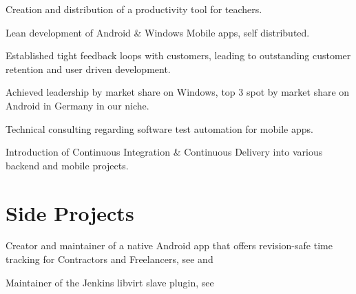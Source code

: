 \documentclass[]{resume}
\begin{document}
\begin{minipage}[t]{0.64\textwidth}
\begin{tightemize}
\item Creation and distribution of a productivity tool for teachers.
\item Lean development of Android \& Windows Mobile apps, self distributed.
\item Established tight feedback loops with customers, leading to outstanding customer retention and user driven development.
\item Achieved leadership by market share on Windows, top 3 spot by market share on Android in Germany in our niche.
\end{tightemize}
\sectionsep

\begin{tightemize}
\item Technical consulting regarding software test automation for mobile apps.
\item Introduction of Continuous Integration \& Continuous Delivery into various backend and mobile projects.
\end{tightemize}
\sectionsep



\section{Side Projects}

Creator and maintainer of a native Android app that offers revision-safe time tracking for Contractors and Freelancers, see \href{https://github.com/tastybug/timetracker}{} and \href{https://play.google.com/store/apps/details?id=com.tastybug.timetracker}{}
\sectionsep

Maintainer of the Jenkins libvirt slave plugin, see \href{https://wiki.jenkins.io/display/JENKINS/Libvirt+Slaves+Plugin}{}
\sectionsep

\end{minipage} 
\end{document}
